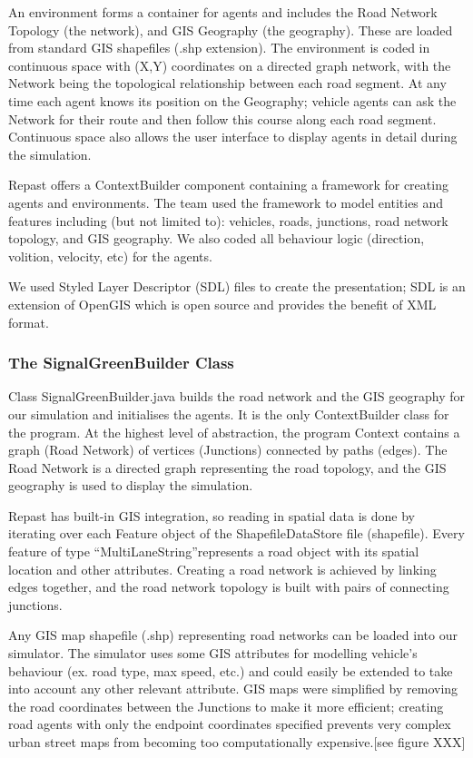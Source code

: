 \documentclass[11pt]{article}
\begin{document}
An environment forms a container for agents and includes the Road Network Topology (the network), and GIS Geography (the geography). These are loaded from standard GIS shapefiles (.shp extension). The environment is coded in continuous space with (X,Y) coordinates on a directed graph network, with the Network being the topological relationship between each road segment. At any time each agent knows its position on the Geography; vehicle agents can ask the Network for their route and then follow this course along each road segment. Continuous space also allows the user interface to display agents in detail during the simulation.

Repast offers a ContextBuilder component containing a framework for creating agents and environments. The team used the framework to model entities and features including (but not limited to): vehicles, roads, junctions, road network topology, and GIS geography. We also coded all behaviour logic (direction, volition, velocity, etc) for the agents.

We used Styled Layer Descriptor (SDL) files to create the presentation; SDL is an extension of OpenGIS which is open source and provides the benefit of XML format.


\subsubsection{The SignalGreenBuilder Class}

Class SignalGreenBuilder.java builds the road network and the GIS geography for our simulation and initialises the agents. It is the only ContextBuilder class for the program. At the highest level of abstraction, the program Context contains a graph (Road Network) of vertices (Junctions) connected by paths (edges). The Road Network is a directed graph representing the road topology, and the GIS geography is used to display the simulation. 

Repast has built-in GIS integration, so reading in spatial data is done by iterating over each Feature object of the ShapefileDataStore file (shapefile). Every feature of type \textquotedblleft MultiLaneString\textquotedblright represents a road object with its spatial location and other attributes. Creating a road network is achieved by linking edges together, and the road network topology is built with pairs of connecting junctions.

Any GIS map shapefile (.shp) representing road networks can be loaded into our simulator. The simulator uses some GIS attributes for modelling vehicle\textquoteright s behaviour (ex. road type, max speed, etc.) and could easily be extended to take into account any other relevant attribute.
GIS maps were simplified by removing the road coordinates between the Junctions to make it more efficient; creating road agents with only the endpoint coordinates specified prevents very complex urban street maps from becoming too computationally expensive.[see figure XXX] 
\\
\end{document}
